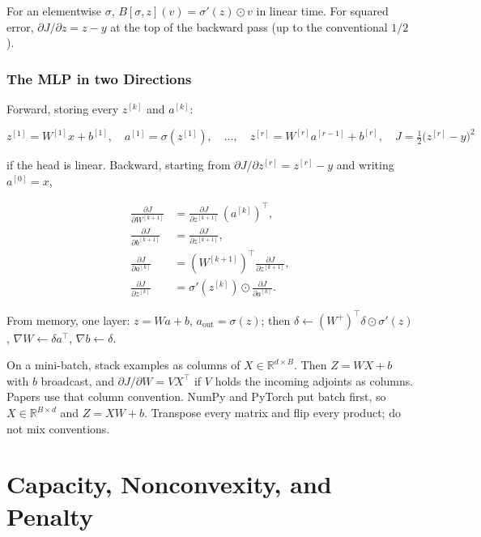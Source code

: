 \documentclass[
]{book}
\begin{document}
For an elementwise \(\sigma\), \(B[\sigma,z](v)=\sigma'(z)\odot v\) in linear time. For squared error, \(\partial J/\partial z=z-y\) at the top of the backward pass (up to the conventional \(1/2\)).

\subsubsection*{The MLP in two Directions}\label{the-mlp-in-two-directions}

Forward, storing every \(z^{[k]}\) and \(a^{[k]}\):

\[
z^{[1]}=W^{[1]}x+b^{[1]},\quad a^{[1]}=\sigma(z^{[1]}),\quad
\ldots,\quad
z^{[r]}=W^{[r]}a^{[r-1]}+b^{[r]},\quad
J=\tfrac12\bigl(z^{[r]}-y\bigr)^2
\]

if the head is linear. Backward, starting from \(\partial J/\partial z^{[r]}=z^{[r]}-y\) and writing \(a^{[0]}=x\),

\[
\begin{aligned}
\frac{\partial J}{\partial W^{[k+1]}}
&=\frac{\partial J}{\partial z^{[k+1]}}\,(a^{[k]})^\top,\\
\frac{\partial J}{\partial b^{[k+1]}}
&=\frac{\partial J}{\partial z^{[k+1]}},\\
\frac{\partial J}{\partial a^{[k]}}
&=(W^{[k+1]})^\top\frac{\partial J}{\partial z^{[k+1]}},\\
\frac{\partial J}{\partial z^{[k]}}
&=\sigma'(z^{[k]})\odot\frac{\partial J}{\partial a^{[k]}}.
\end{aligned}
\]

From memory, one layer: \(z=Wa+b\), \(a_{\mathrm{out}}=\sigma(z)\); then \(\delta\leftarrow(W^{+})^\top\delta\odot\sigma'(z)\), \(\nabla W\leftarrow\delta a^\top\), \(\nabla b\leftarrow\delta\).

On a mini-batch, stack examples as columns of \(X\in\mathbb{R}^{d\times B}\). Then \(Z=WX+b\) with \(b\) broadcast, and \(\partial J/\partial W=VX^\top\) if \(V\) holds the incoming adjoints as columns. Papers use that column convention. NumPy and PyTorch put batch first, so \(X\in\mathbb{R}^{B\times d}\) and \(Z=XW+b\). Transpose every matrix and flip every product; do not mix conventions.

\section{Capacity, Nonconvexity, and Penalty}\label{capacity-nonconvexity-and-penalty}
\end{document}
